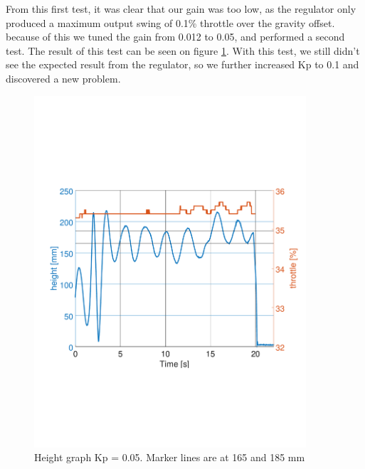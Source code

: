 From this first test, it was clear that our gain was too low, as the regulator only produced a maximum output swing of 0.1\% throttle over the gravity offset. because of this we tuned the gain from 0.012 to 0.05, and performed a second test. The result of this test can be seen on figure \ref{fig:second_test}.
With this test, we still didn't see the expected result from the regulator, so we further increased Kp to 0.1 and discovered a new problem.

\begin{figure}[H]
    \centering
    \includegraphics[width=0.9\textwidth, trim={0 7cm 0 7cm},clip]{figures/Appendix/final_test/kp0,05.pdf}
    \caption{Height graph Kp = 0.05. Marker lines are at 165 and 185 mm}
    \label{fig:second_test}
\end{figure}

